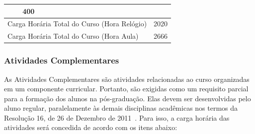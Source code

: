 \documentclass[11pt,fleqn]{book} %
\begin{document}
\begin{table}[]
{\begin{tabular}{|l|l|c|c|c|c|c|c|c|}
			& 400                 \\ \hline
			\multicolumn{8}{|l|}{Carga Horária Total do Curso (Hora Relógio)}                                                                                                                                                                                        
			& 2020                 \\ \hline
			\multicolumn{8}{|l|}{Carga Horária Total do Curso (Hora Aula)}                                                                                                                                                                                        
			& 2666                 \\ \hline			
		\end{tabular}%
	}
\end{table}

\subsubsection{Atividades Complementares}

As Atividades Complementares são atividades relacionadas ao curso organizadas em um componente curricular.
Portanto, são exigidas como um requisito parcial para a formação dos alunos na pós-graduação.
Elas devem ser desenvolvidas pelo aluno regular, paralelamente às demais disciplinas acadêmicas nos termos da Resolução 16, de 26 de Dezembro de 2011~\cite{Resolucao16De2011}.
Para isso, a carga horária das atividades será concedida de acordo com os itens abaixo:
\end{document}
